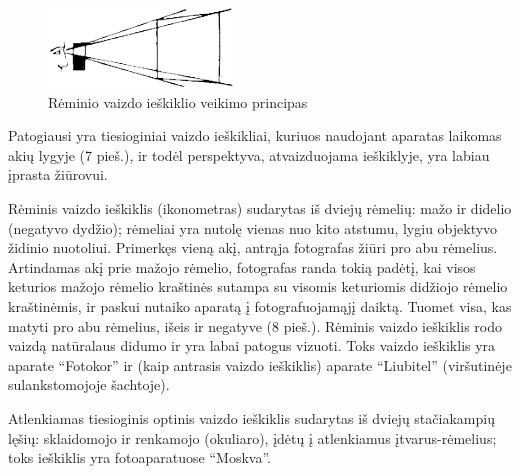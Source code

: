 \documentclass[12pt]{book}
\begin{document}
\begin{figure}[!h]
\begin{minipage}[t]{0.4\textwidth}
							\label{fig:7}
						\end{minipage}
						\hfill
						\begin{minipage}[t]{0.4\textwidth}
							\includegraphics[width=\textwidth]{8-pav}
							\caption{Rėminio vaizdo ieškiklio veikimo principas}
							\label{fig:8}
						\end{minipage}
					\end{figure}

					Patogiausi yra tiesioginiai vaizdo ieškikliai, kuriuos naudojant aparatas laikomas akių lygyje (7 pieš.), ir todėl perspektyva, atvaizduojama ieškiklyje, yra labiau įprasta žiūrovui.

					Rėminis vaizdo ieškiklis (ikonometras) sudarytas iš dviejų rėmelių: mažo ir didelio (negatyvo dydžio); rėmeliai yra nutolę vienas nuo kito atstumu, lygiu objektyvo židinio nuotoliui. Primerkęs vieną akį, antrąja fotografas žiūri pro abu rėmelius. Artindamas akį prie mažojo rėmelio, fotografas randa tokią padėtį, kai visos keturios mažojo rėmelio kraštinės sutampa su visomis keturiomis didžiojo rėmelio kraštinėmis, ir paskui nutaiko aparatą į fotografuojamąjį daiktą. Tuomet visa, kas matyti pro abu rėmelius, išeis ir negatyve (8 pieš.). Rėminis vaizdo ieškiklis rodo vaizdą natūralaus didumo ir yra labai patogus vizuoti. Toks vaizdo ieškiklis yra aparate ``Fotokor'' ir (kaip antrasis vaizdo ieškiklis) aparate ``Liubitel'' (viršutinėje sulankstomojoje šachtoje).

					Atlenkiamas tiesioginis optinis vaizdo ieškiklis sudarytas iš dviejų stačiakampių lęšių: sklaidomojo ir renkamojo (okuliaro), įdėtų į atlenkiamus įtvarus-rėmelius; toks ieškiklis yra fotoaparatuose ``Moskva''.
\end{document}
